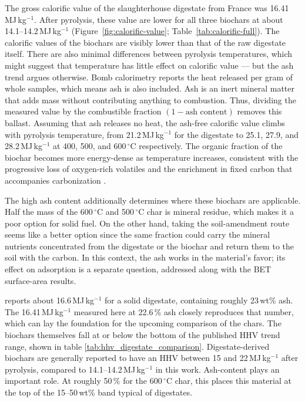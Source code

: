 The gross calorific value of the slaughterhouse digestate from France was 16.41\,MJ\,kg$^{-1}$. After pyrolysis, these value are lower for all three biochars at about 14.1--14.2\,MJ\,kg$^{-1}$ (Figure~\ref{fig:calorific-value}; Table~\ref{tab:calorific-full}). The calorific values of the biochars are visibly lower than that of the raw digestate itself. There are also minimal differences between pyrolysis temperatures, which might suggest that temperature has little effect on calorific value — but the ash trend argues otherwise. Bomb calorimetry reports the heat released per gram of whole samples, which means ash is also included. Ash is an inert mineral matter that adds mass without contributing anything to combustion. Thus, dividing the measured value by the combustible fraction $(1 - \text{ash content})$ removes this ballast. Assuming that ash releases no heat, the ash-free calorific value climbs with pyrolysis temperature, from 21.2\,MJ\,kg$^{-1}$ for the digestate to 25.1, 27.9, and 28.2\,MJ\,kg$^{-1}$ at 400, 500, and 600\,$^{\circ}$C respectively. The organic fraction of the biochar becomes more energy-dense as temperature increases, consistent with the progressive loss of oxygen-rich volatiles and the enrichment in fixed carbon that accompanies carbonization \parencite{pecchi-2019, hung-2017}. 




The high ash content additionally determines where these biochars are applicable. Half the mass of the 600\,$^{\circ}$C and 500\,$^{\circ}$C char is mineral residue, which makes it a poor option for solid fuel. On the other hand, taking the soil-amendment route seems like a better option since the same fraction could carry the mineral nutrients concentrated from the digestate or the biochar and return them to the soil with the carbon. In this context, the ash works in the material's favor; its effect on adsorption is a separate question, addressed along with the BET surface-area results.

\vspace{0.3em}

\textcite{hung-2017} reports about 16.6\,MJ\,kg$^{-1}$ for a solid digestate, containing roughly 23\,wt\% ash. The 16.41\,MJ\,kg$^{-1}$ measured here at 22.6\,\% ash closely reproduces that number, which can lay the foundation for the upcoming comparison of the chars. The biochars themselves fall at or below the bottom of the published HHV trend range, shown in table \ref{tab:hhv_digestate_comparison}. Digestate-derived biochars are generally reported to have an HHV between 15 and 22\,MJ\,kg$^{-1}$ after pyrolysis, compared to 14.1--14.2\,MJ\,kg$^{-1}$ in
this work. Ash-content plays an important role. At roughly 50\,\% for the
600\,$^{\circ}$C char, this places this material at the top of the 15--50\,wt\% band
typical of digestates.

